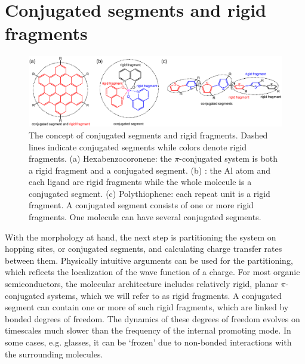 \section{Conjugated segments and rigid fragments}
\label{sec:segments}

\begin{figure}
\includegraphics[width=\linewidth]{fig/conjugated_segment/fragment_segment}
\caption{The concept of conjugated segments and rigid fragments. Dashed lines indicate conjugated segments while colors denote rigid fragments. (a) Hexabenzocoronene: the $\pi$-conjugated system is both a rigid fragment and a conjugated segment. (b) \Alq: the Al atom and each ligand are rigid fragments while the whole molecule is a conjugated segment. (c) Polythiophene: each repeat unit is a rigid fragment. A conjugated segment consists of one or more rigid fragments. One molecule can have several conjugated segments.}
\label{fig:segment}
\end{figure}

With the morphology at hand, the next step is partitioning the system on hopping sites, or conjugated segments, and calculating charge transfer rates between them. Physically intuitive arguments can be used for the partitioning,  which reflects the localization of the wave function of a charge. For most organic semiconductors, the molecular architecture includes relatively rigid, planar $\pi$-conjugated systems, which we will refer to as rigid fragments. A conjugated segment can contain one or more of such rigid fragments, which are linked by bonded degrees of freedom. The dynamics of these degrees of freedom evolves on timescales much slower than the frequency of the internal promoting mode. In some cases, e.g. glasses, it can be `frozen' due to non-bonded interactions with the surrounding molecules.

